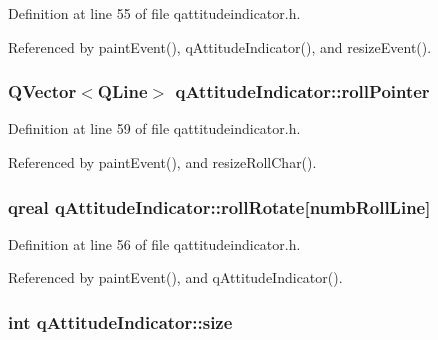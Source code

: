 Definition at line 55 of file qattitudeindicator.\-h.



Referenced by paint\-Event(), q\-Attitude\-Indicator(), and resize\-Event().

\hypertarget{classqAttitudeIndicator_ac5ace954b2f7b2d88aeae586a1246c30}{
\subsubsection[{roll\-Pointer}]{\setlength{\rightskip}{0pt plus 5cm}Q\-Vector$<$Q\-Line$>$ q\-Attitude\-Indicator\-::roll\-Pointer\hspace{0.3cm}{\ttfamily [private]}}}\label{classqAttitudeIndicator_ac5ace954b2f7b2d88aeae586a1246c30}


Definition at line 59 of file qattitudeindicator.\-h.



Referenced by paint\-Event(), and resize\-Roll\-Char().

\hypertarget{classqAttitudeIndicator_afa3060f26300228565f05c0200d553c2}{
\subsubsection[{roll\-Rotate}]{\setlength{\rightskip}{0pt plus 5cm}qreal q\-Attitude\-Indicator\-::roll\-Rotate\mbox{[}{\bf numb\-Roll\-Line}\mbox{]}\hspace{0.3cm}{\ttfamily [private]}}}\label{classqAttitudeIndicator_afa3060f26300228565f05c0200d553c2}


Definition at line 56 of file qattitudeindicator.\-h.



Referenced by paint\-Event(), and q\-Attitude\-Indicator().

\hypertarget{classqAttitudeIndicator_a0d7a73e4ee536cda1a005f626ef3935f}{
\subsubsection[{size}]{\setlength{\rightskip}{0pt plus 5cm}int q\-Attitude\-Indicator\-::size\hspace{0.3cm}{\ttfamily [private]}}}\label{classqAttitudeIndicator_a0d7a73e4ee536cda1a005f626ef3935f}


